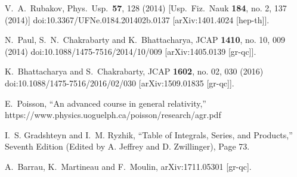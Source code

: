 \documentclass[24pt]{article}
\begin{document}
\begin{thebibliography}{999}
  V.~A.~Rubakov,
  Phys.\ Usp.\  {\bf 57}, 128 (2014)
  [Usp.\ Fiz.\ Nauk {\bf 184}, no. 2, 137 (2014)]
  doi:10.3367/UFNe.0184.201402b.0137
  [arXiv:1401.4024 [hep-th]].

  N.~Paul, S.~N.~Chakrabarty and K.~Bhattacharya,
  JCAP {\bf 1410}, no. 10, 009 (2014)
  doi:10.1088/1475-7516/2014/10/009
  [arXiv:1405.0139 [gr-qc]].

  K.~Bhattacharya and S.~Chakrabarty,
  JCAP {\bf 1602}, no. 02, 030 (2016)
  doi:10.1088/1475-7516/2016/02/030
  [arXiv:1509.01835 [gr-qc]].

  E.~Poisson, ``An advanced course in general relativity,''
  https://www.physics.uoguelph.ca/poisson/research/agr.pdf

I.~S. Gradshteyn and I.~M. Ryzhik, ``Table of Integrals, Series, and Products,''
Seventh Edition (Edited by A. Jeffrey and D. Zwillinger), Page 73.  

  A.~Barrau, K.~Martineau and F.~Moulin,
  arXiv:1711.05301 [gr-qc].


\end{thebibliography}
\end{document}
